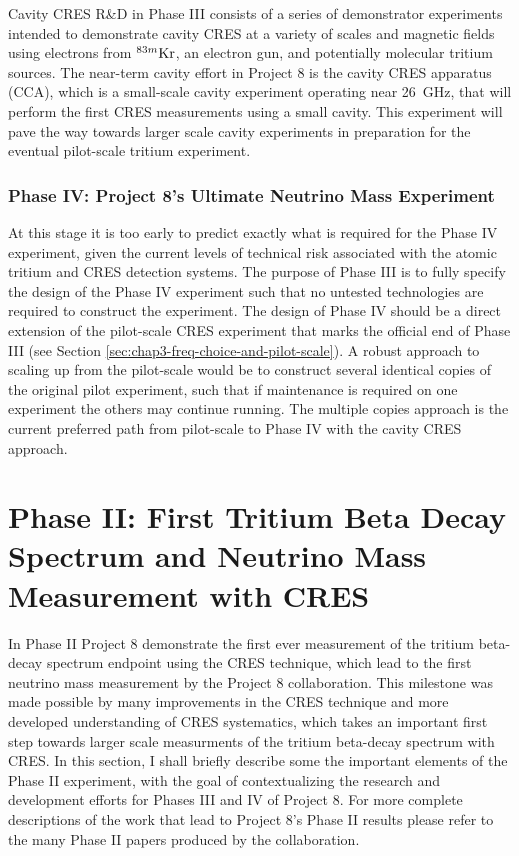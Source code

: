 Cavity CRES R\&D in Phase III consists of a series of demonstrator experiments intended to demonstrate cavity CRES at a variety of scales and magnetic fields using electrons from $^{83m}\rm{Kr}$, an electron gun, and potentially molecular tritium sources. The near-term cavity effort in Project 8 is the cavity CRES apparatus (CCA), which is a small-scale cavity experiment operating near 26~GHz, that will perform the first CRES measurements using a small cavity. This experiment will pave the way towards larger scale cavity experiments in preparation for the eventual pilot-scale tritium experiment.

\subsubsection*{Phase IV: Project 8's Ultimate Neutrino Mass Experiment}

At this stage it is too early to predict exactly what is required for the Phase IV experiment, given the current levels of technical risk associated with the atomic tritium and CRES detection systems. The purpose of Phase III is to fully specify the design of the Phase IV experiment such that no untested technologies are required to construct the experiment. The design of Phase IV should be a direct extension of the pilot-scale CRES experiment that marks the official end of Phase III (see Section \ref{sec:chap3-freq-choice-and-pilot-scale}). A robust approach to scaling up from the pilot-scale would be to construct several identical copies of the original pilot experiment, such that if maintenance is required on one experiment the others may continue running. The multiple copies approach is the current preferred path from pilot-scale to Phase IV with the cavity CRES approach.

\section{Phase II: First Tritium Beta Decay Spectrum and Neutrino Mass Measurement with CRES}
\label{sec:chap3-phaseII}

In Phase II Project 8 demonstrate the first ever measurement of the tritium beta-decay spectrum endpoint using the CRES technique, which lead to the first neutrino mass measurement by the Project 8 collaboration. This milestone was made possible by many improvements in the CRES technique and more developed understanding of CRES systematics, which takes an important first step towards larger scale measurments of the tritium beta-decay spectrum with CRES. In this section, I shall briefly describe some the important elements of the Phase II experiment, with the goal of contextualizing the research and development efforts for Phases III and IV of Project 8. For more complete descriptions of the work that lead to Project 8's Phase II results please refer to the many Phase II papers produced by the collaboration.

